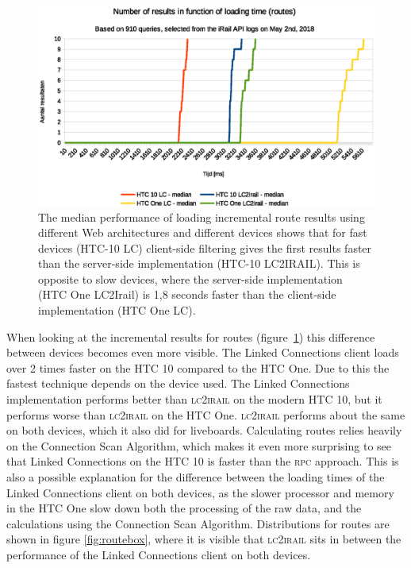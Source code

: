 \documentclass[twocolumn]{phdsymp} %
\begin{document}
\begin{figure}[ht]
	\begin{center}
		\includegraphics[width=.50\textwidth]{images/dief_routes_average.eps}
		\caption{\label{fig:route} The median performance of loading incremental route results using different Web architectures and different devices shows that for fast devices (HTC-10 LC) client-side filtering gives the first results faster than the server-side implementation (HTC-10 LC2IRAIL). This is opposite to slow devices, where the server-side implementation (HTC One LC2Irail) is 1,8 seconds faster than the client-side implementation (HTC One LC).}
	\end{center}
\end{figure}

When looking at the incremental results for routes (figure~\ref{fig:route}) this difference between devices becomes even more visible. The Linked Connections client loads over 2 times faster on the HTC 10 compared to the HTC One. Due to this the fastest technique depends on the device used. The Linked Connections implementation performs better than \textsc{lc2irail} on the modern HTC 10, but it performs worse than \textsc{lc2irail} on the HTC One. \textsc{lc2irail} performs about the same on both devices, which it also did for liveboards. Calculating routes relies heavily on the Connection Scan Algorithm, which makes it even more surprising to see that Linked Connections on the HTC 10 is faster than the \textsc{rpc} approach. This is also a possible explanation for the difference between the loading times of the Linked Connections client on both devices, as the slower processor and memory in the HTC One slow down both the processing of the raw data, and the calculations using the Connection Scan Algorithm. Distributions for routes are shown in figure \ref{fig:routebox}, where it is visible that \textsc{lc2irail} sits in between the performance of the Linked Connections client on both devices.
\end{document}
